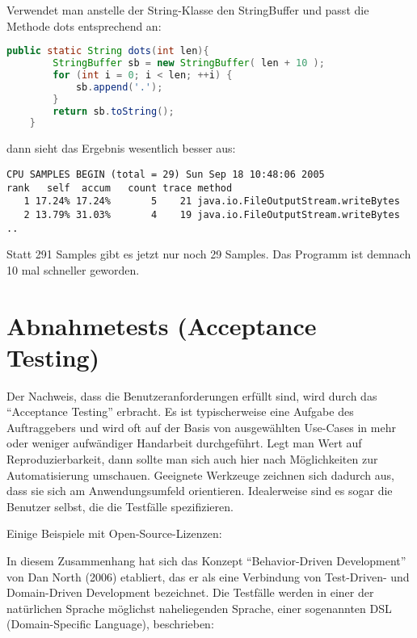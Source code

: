 Verwendet man anstelle der String-Klasse den StringBuffer und passt die
Methode dots entsprechend an:
\fi
\begin{lstlisting}[language=java]
   public static String dots(int len){
        StringBuffer sb = new StringBuffer( len + 10 );
        for (int i = 0; i < len; ++i) {
            sb.append('.');
        }
        return sb.toString();
    }
\end{lstlisting}
\ifslides
\newpage
\fi
dann sieht das Ergebnis wesentlich besser aus:
{\ifslides\footnotesize
\else\small
\fi
\begin{lstlisting}
CPU SAMPLES BEGIN (total = 29) Sun Sep 18 10:48:06 2005
rank   self  accum   count trace method
   1 17.24% 17.24%       5    21 java.io.FileOutputStream.writeBytes
   2 13.79% 31.03%       4    19 java.io.FileOutputStream.writeBytes
..
\end{lstlisting}
}
Statt 291 Samples gibt es jetzt nur noch 29 Samples. Das Programm ist demnach
10 mal schneller geworden.
%
\newpage
\section{Abnahmetests (Acceptance Testing)}
Der Nachweis, dass die
Benutzeranforderungen erfüllt sind, wird durch
das ``Acceptance Testing'' erbracht.
Es ist typischerweise eine Aufgabe des Auftraggebers und wird oft
auf der Basis von ausgewählten Use-Cases in mehr oder weniger
aufwändiger Handarbeit durchgeführt. Legt man Wert auf Reproduzierbarkeit,
dann sollte man sich auch hier nach Möglichkeiten zur Automatisierung
umschauen. Geeignete Werkzeuge zeichnen sich dadurch aus, dass
sie sich am Anwendungsumfeld orientieren. Idealerweise sind es sogar die
Benutzer selbst, die die Testfälle spezifizieren.

\newslide
Einige Beispiele mit Open-Source-Lizenzen:
\newslide
In diesem Zusammenhang hat sich das Konzept ``Behavior-Driven
Development'' von Dan North (2006) etabliert, das er als eine Verbindung von
Test-Driven- und Domain-Driven Development bezeichnet. Die Testfälle
werden in einer der natürlichen Sprache möglichst naheliegenden
Sprache, einer sogenannten DSL (Domain-Specific Language), beschrieben:

